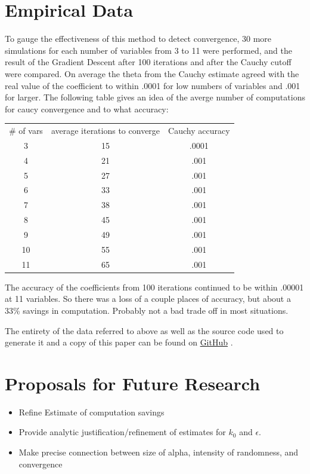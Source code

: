 \documentclass[11pt]{article} %
\begin{document}
\section{Empirical Data}
To gauge the effectiveness of this method to detect convergence, 30 more simulations for each number of variables from 3 to 11 were performed, and the result of the Gradient Descent after 100 iterations and after the Cauchy cutoff were compared. On average the theta from the Cauchy estimate agreed with the real value of the coefficient to within .0001 for low numbers of variables and .001 for larger.  The following table gives an idea of the averge number of computations for caucy convergence and to what accuracy: 

\begin{tabular} {ccc}
\# of vars & average iterations to converge & Cauchy accuracy\\
3 &  15 & .0001 \\
4 &  21  & .001 \\
5 &  27 & .001 \\
6 &  33 & .001 \\
7 &  38 & .001 \\
8 & 45 & .001 \\
9 & 49 & .001\\
10 & 55 & .001\\
11 & 65 & .001

\end{tabular} 

The accuracy of the coefficients from 100 iterations continued to be within .00001 at 11 variables.  So there was a loss of a couple places of accuracy, but about a 33\% savings in computation.  Probably not a bad trade off in most situations.  

The entirety of the data referred to above as well as the source code used to generate it and a copy of this paper can be found on \href{ https://github.com/likes2addfunctions/CodeSamples/tree/master/GDCauchyMethod }{ GitHub} .

\section{Proposals for Future Research}
\begin{itemize}
\item Refine Estimate of computation savings 

\item Provide analytic justification/refinement of estimates for $k_{0}$ and $\epsilon$. 

\item Make precise connection between size of alpha, intensity of randomness, and convergence

\end{itemize}
\end{document}
